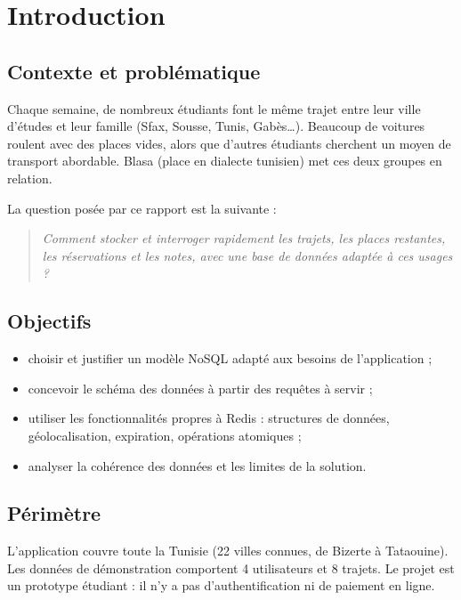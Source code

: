 \documentclass[11pt,a4paper]{article}
\begin{document}
\tableofcontents
\newpage

\section{Introduction}

\subsection{Contexte et probl\'ematique}
Chaque semaine, de nombreux \'etudiants font le m\^eme trajet entre leur ville d'\'etudes et leur famille (Sfax, Sousse, Tunis, Gab\`es\ldots). Beaucoup de voitures roulent avec des places vides, alors que d'autres \'etudiants cherchent un moyen de transport abordable. Blasa (\og place \fg{} en dialecte tunisien) met ces deux groupes en relation.

La question pos\'ee par ce rapport est la suivante :
\begin{quote}
\emph{Comment stocker et interroger rapidement les trajets, les places restantes, les r\'eservations et les notes, avec une base de donn\'ees adapt\'ee \`a ces usages ?}
\end{quote}

\subsection{Objectifs}
\begin{itemize}
  \item choisir et justifier un mod\`ele NoSQL adapt\'e aux besoins de l'application ;
  \item concevoir le sch\'ema des donn\'ees \`a partir des requ\^etes \`a servir ;
  \item utiliser les fonctionnalit\'es propres \`a Redis : structures de donn\'ees, g\'eolocalisation, expiration, op\'erations atomiques ;
  \item analyser la coh\'erence des donn\'ees et les limites de la solution.
\end{itemize}

\subsection{P\'erim\`etre}
L'application couvre toute la Tunisie (22 villes connues, de Bizerte \`a Tataouine). Les donn\'ees de d\'emonstration comportent 4 utilisateurs et 8 trajets. Le projet est un prototype \'etudiant : il n'y a pas d'authentification ni de paiement en ligne.
\end{document}
